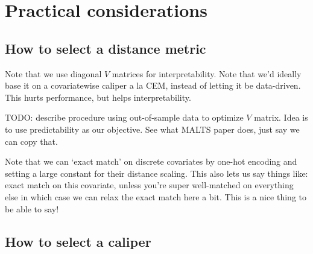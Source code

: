\documentclass{article}
\begin{document}

\appendix

\section{Practical considerations}

\subsection{How to select a distance metric}
\label{app:metricchoice}

Note that we use diagonal $V$ matrices for interpretability.
Note that we'd ideally base it on a covariatewise caliper a la CEM, instead of letting it be data-driven.
This hurts performance, but helps interpretability.

TODO: describe procedure using out-of-sample data to optimize $V$ matrix.
Idea is to use predictability as our objective.
See what MALTS paper does, just say we can copy that.

Note that we can `exact match' on discrete covariates by one-hot encoding and setting a large constant for their distance scaling.
This also lets us say things like: exact match on this covariate, unless you're super well-matched on everything else in which case we can relax the exact match here a bit.
This is a nice thing to be able to say!


\subsection{How to select a caliper}
\label{app:caliperchoice}
\end{document}
